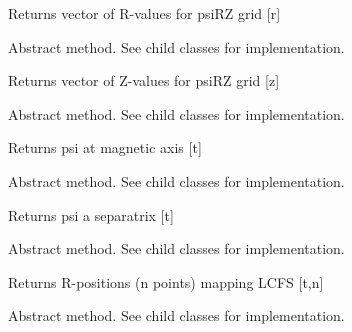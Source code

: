 \documentclass[letterpaper,10pt,english]{sphinxmanual}
\begin{document}
\begin{fulllineitems}
\begin{fulllineitems}
Returns vector of R-values for psiRZ grid {[}r{]}

\end{fulllineitems}


\begin{fulllineitems}
\label{eqtools:eqtools.core.Equilibrium.getZGrid}
Abstract method.  See child classes for implementation.

Returns vector of Z-values for psiRZ grid {[}z{]}

\end{fulllineitems}


\begin{fulllineitems}
\label{eqtools:eqtools.core.Equilibrium.getFluxAxis}
Abstract method.  See child classes for implementation.

Returns psi at magnetic axis {[}t{]}

\end{fulllineitems}


\begin{fulllineitems}
\label{eqtools:eqtools.core.Equilibrium.getFluxLCFS}
Abstract method.  See child classes for implementation.

Returns psi a separatrix {[}t{]}

\end{fulllineitems}


\begin{fulllineitems}
\label{eqtools:eqtools.core.Equilibrium.getRLCFS}
Abstract method.  See child classes for implementation.

Returns R-positions (n points) mapping LCFS {[}t,n{]}

\end{fulllineitems}


\begin{fulllineitems}
\label{eqtools:eqtools.core.Equilibrium.getZLCFS}
Abstract method.  See child classes for implementation.


\end{fulllineitems}
\end{fulllineitems}
\end{document}
